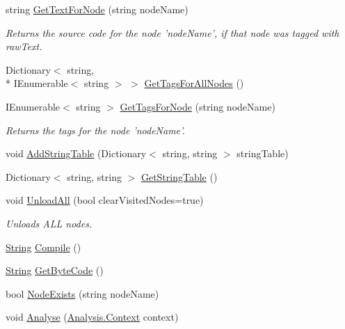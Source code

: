 \begin{DoxyCompactItemize}
\item 
string \hyperlink{a00088_a594641914a2b59cc5231645273d18e82}{Get\-Text\-For\-Node} (string node\-Name)
\begin{DoxyCompactList}\small\item\em Returns the source code for the node 'node\-Name', if that node was tagged with raw\-Text. \end{DoxyCompactList}\item 
Dictionary$<$ string, \\*
I\-Enumerable$<$ string $>$ $>$ \hyperlink{a00088_a20ef38a17e4a346de3b572b85052c1d1}{Get\-Tags\-For\-All\-Nodes} ()
\item 
I\-Enumerable$<$ string $>$ \hyperlink{a00088_ab85166316a6c5aadce336316406ed164}{Get\-Tags\-For\-Node} (string node\-Name)
\begin{DoxyCompactList}\small\item\em Returns the tags for the node 'node\-Name'. \end{DoxyCompactList}\item 
void \hyperlink{a00088_acfb8561e08dc85c6d9a855ad07d18783}{Add\-String\-Table} (Dictionary$<$ string, string $>$ string\-Table)
\item 
Dictionary$<$ string, string $>$ \hyperlink{a00088_af5fe57ebd11c41208070972f06a31b9d}{Get\-String\-Table} ()
\item 
void \hyperlink{a00088_a7acfe32f91b36ee812059f2ad3011133}{Unload\-All} (bool clear\-Visited\-Nodes=true)
\begin{DoxyCompactList}\small\item\em Unloads A\-L\-L nodes. \end{DoxyCompactList}\item 
\hyperlink{a00048_a301aa7c866593a5b625a8fc158bbeacea27118326006d3829667a400ad23d5d98}{String} \hyperlink{a00088_a7a8a3a461011172f5624da3a8ffa875f}{Compile} ()
\item 
\hyperlink{a00048_a301aa7c866593a5b625a8fc158bbeacea27118326006d3829667a400ad23d5d98}{String} \hyperlink{a00088_aade6c069db8f01572060d25a963d2a14}{Get\-Byte\-Code} ()
\item 
bool \hyperlink{a00088_a93bb76a1f9a4058f225ff4cee97483c6}{Node\-Exists} (string node\-Name)
\item 
void \hyperlink{a00088_a6b67b239f50c062160666e54592c433f}{Analyse} (\hyperlink{a00054}{Analysis.\-Context} context)
\end{DoxyCompactItemize}
